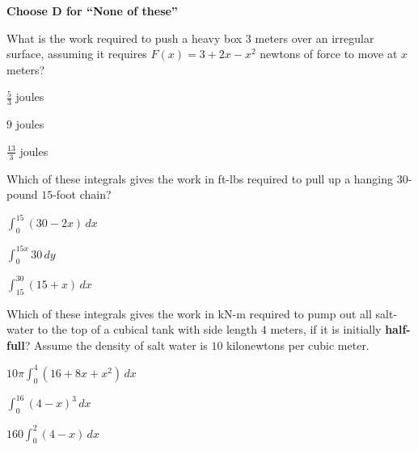 \documentclass[12pt]{exam}
\newcommand{\<}{(}
\renewcommand{\>}{)}
\begin{document}
\begin{center}
\end{center}
\vspace{0.1in}

\vspace{12pt}

\textbf{Choose D for ``None of these''}

\begin{questions}\setcounter{question}{15}

\question
What is the work required to push a heavy box \(3\) meters over
an irregular surface, assuming it requires \(F(x)=3+2x-x^2\) newtons
of force to move at \(x\) meters?
\begin{choices}
\item \(\frac{5}{3}\) joules
\item \(9\) joules
\item \(\frac{13}{3}\) joules
\end{choices}

\question
Which of these integrals gives the work in ft-lbs
required to pull up a hanging \(30\)-pound \(15\)-foot chain?
\begin{choices}
\item \(\int_0^{15}(30-2x)\,dx\)
\item \(\int_0^{15x}30\,dy\)
\item \(\int_{15}^{30}(15+x)\,dx\)
\end{choices}

\question
Which of these integrals gives the work in kN-m required to
pump out all salt-water to the top of a cubical tank with side length
\(4\) meters, if it is initially \textbf{half-full}? Assume the density of
salt water is \(10\) kilonewtons per cubic meter.
\begin{choices}
\item \(10\pi\int_0^4(16+8x+x^2)\,dx\)
\item \(\int_0^{16}(4-x)^3\,dx\)
\item \(160\int_0^2(4-x)\,dx\)
\end{choices}




\end{questions}
\end{document}
